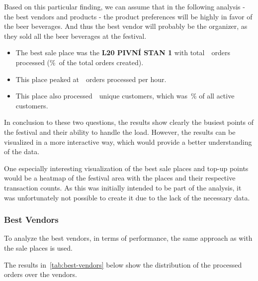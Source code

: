 Based on this particular finding, we can assume that in the following analysis - the best vendors and products - the product preferences will be highly in favor of the beer beverages.
And thus the best vendor will probably be the organizer, as they sold all the beer beverages at the festival.

\begin{keytakeaways}
	\begin{itemize}
		\item The best sale place was the \textbf{L20 PIVNÍ STAN 1} with total~~orders processed (\%~of the total orders created).
		\item This place peaked at~~orders processed per hour.
		\item This place also processed~~unique customers, which was~\% of all active customers.
	\end{itemize}
\end{keytakeaways}

In conclusion to these two questions, the results show clearly the busiest points of the festival and their ability to handle the load.
However, the results can be visualized in a more interactive way, which would provide a better understanding of the data.

One especially interesting visualization of the best sale places and top-up points would be a heatmap of the festival area with the places and their respective transaction counts.
As this was initially intended to be part of the analysis, it was unfortunately not possible to create it due to the lack of the necessary data.


\subsubsection{Best Vendors}
\label{subsubsec:analysis-best-vendors}

To analyze the best vendors, in terms of performance, the same approach as with the sale places is used.


The results in~\autoref{tab:best-vendors} below show the distribution of the processed orders over the vendors.

